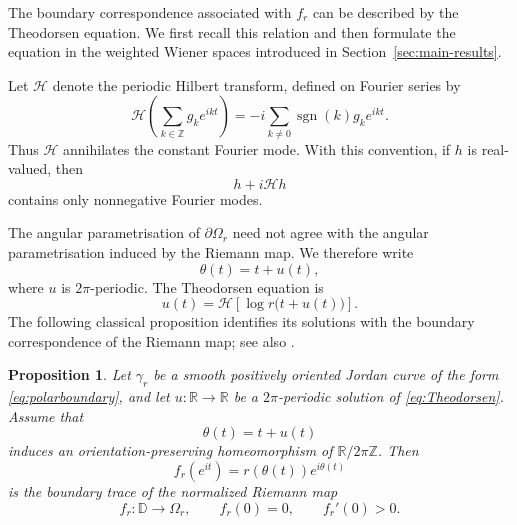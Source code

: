 \documentclass[11pt,a4paper]{amsart}
\newtheorem{proposition}[theorem]{Proposition}
\begin{document}
The boundary correspondence associated with $f_r$ can be described by
the Theodorsen equation. We first recall this relation and then
formulate the equation in the weighted Wiener spaces introduced in
Section~\ref{sec:main-results}.

Let $\mathcal H$ denote the periodic Hilbert transform, defined on
Fourier series by
\begin{equation}\label{eq:Hilbert}
	\mathcal H
	\left(
	\sum_{k\in\mathbb Z}g_ke^{ikt}
	\right)
	=
	-i\sum_{k\ne0}
	\operatorname{sgn}(k)g_ke^{ikt}.
\end{equation}
Thus $\mathcal H$ annihilates the constant Fourier mode. With this
convention, if $h$ is real-valued, then
\[
h+i\mathcal Hh
\]
contains only nonnegative Fourier modes.

The angular parametrisation of $\partial\Omega_r$ need not agree with
the angular parametrisation induced by the Riemann map. We therefore
write
\[
\theta(t)=t+u(t),
\]
where $u$ is $2\pi$-periodic. The Theodorsen equation is
\begin{equation}\label{eq:Theodorsen}
	u(t)
	=
	\mathcal H
	\left[
	\log r\bigl(t+u(t)\bigr)
	\right].
\end{equation}
The following classical proposition identifies its solutions with the
boundary correspondence of the Riemann map; see also
\cite{Gutknecht, Hubner,Kythe,Wegmann1978,Wegmann1986}.

\begin{proposition}\label{prop:Theodorsen}
	Let $\gamma_r$ be a smooth positively oriented Jordan curve of the
	form \eqref{eq:polarboundary}, and let
	$u:\mathbb R\to\mathbb R$ be a $2\pi$-periodic solution of
	\eqref{eq:Theodorsen}. Assume that
	\[
	\theta(t)=t+u(t)
	\]
	induces an orientation-preserving homeomorphism of
	$\mathbb R/2\pi\mathbb Z$. Then
	\begin{equation}\label{eq:boundarymap}
		f_r(e^{it})
		=
		r(\theta(t))e^{i\theta(t)}
	\end{equation}
	is the boundary trace of the normalized Riemann map
	\[
	f_r:\mathbb D\longrightarrow\Omega_r,
	\qquad
	f_r(0)=0,
	\qquad
	f_r'(0)>0.
	\]
\end{proposition}
\end{document}
